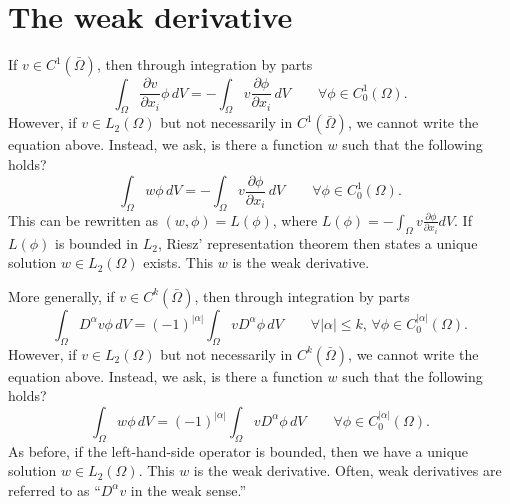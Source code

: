 \documentclass[oneside,a4paper,11pt]{report}
\begin{document}
\section{The weak derivative}
If $v \in C^1(\bar{\Omega})$, then through integration by parts
\begin{equation}
    \int_\Omega \frac{\partial v}{\partial x_i} \phi \, dV = -\int_\Omega v \frac{\partial \phi}{\partial x_i} \, dV \qquad \forall \phi \in C_0^1(\Omega).
\end{equation}
However, if $v \in L_2(\Omega)$ but not necessarily in $C^1(\bar{\Omega})$, we cannot write the equation above. Instead, we ask, is there a function $w$ such that the following holds?
\begin{equation}
     \int_\Omega w \phi \, dV = -\int_\Omega v \frac{\partial \phi}{\partial x_i} \, dV \qquad \forall \phi \in C_0^1(\Omega).
\end{equation}
This can be rewritten as $(w,\phi) = L(\phi)$, where $L(\phi) = -\int_\Omega v \frac{\partial \phi}{\partial x_i} dV$. If $L(\phi)$ is bounded in $L_2$, Riesz' representation theorem then states a unique solution $w \in L_2(\Omega)$ exists. This $w$ is the weak derivative.

More generally, if $v \in C^k(\bar{\Omega})$, then through integration by parts
\begin{equation}
    \int_\Omega D^\alpha v \phi \, dV = (-1)^{|\alpha|} \int_\Omega v D^\alpha \phi \, dV \qquad \forall |\alpha| \le k,\, \forall \phi \in C_0^{|\alpha|}(\Omega).
\end{equation}
However, if $v \in L_2(\Omega)$ but not necessarily in $C^k(\bar{\Omega})$, we cannot write the equation above. Instead, we ask, is there a function $w$ such that the following holds?
\begin{equation}
    \int_\Omega w \phi \, dV = (-1)^{|\alpha|} \int_\Omega v D^\alpha \phi \, dV \qquad \forall \phi \in C_0^{|\alpha|}(\Omega).
\end{equation}
As before, if the left-hand-side operator is bounded, then we have a unique solution $w \in L_2(\Omega)$. This $w$ is the weak derivative. Often, weak derivatives are referred to as ``$D^\alpha v$ in the weak sense.''

\end{document}
